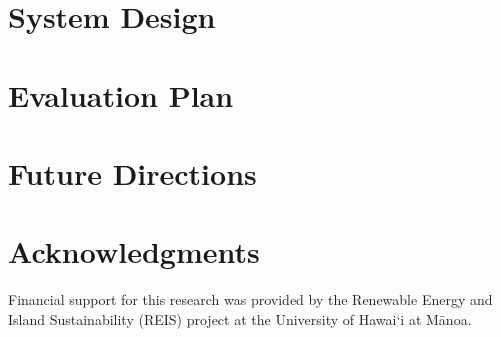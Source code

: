 \documentclass[conference,compsoc,peerreview]{IEEEtran}
\begin{document}
\section{System Design}

\section{Evaluation Plan}

\section{Future Directions}


\section{Acknowledgments}

Financial support for this research was provided by the Renewable Energy and
Island Sustainability (REIS) project at the University of Hawai`i at M\=anoa.




\end{document}
